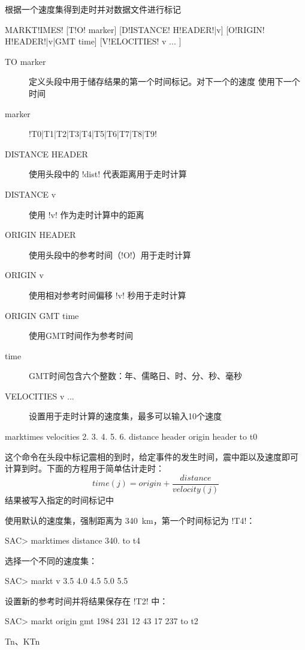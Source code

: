 \label{cmd:marktimes}

根据一个速度集得到走时并对数据文件进行标记

\begin{SACSTX}
MARKT!IMES! [T!O! marker] [D!ISTANCE! H!EADER!|v] [O!RIGIN! H!EADER!|v|GMT time]
    [V!ELOCITIES! v ... ]
\end{SACSTX}

\begin{description}
\item [TO marker] 定义头段中用于储存结果的第一个时间标记。对下一个的速度
    使用下一个时间
\item [marker] !T0|T1|T2|T3|T4|T5|T6|T7|T8|T9!
\item [DISTANCE HEADER] 使用头段中的 !dist! 代表距离用于走时计算
\item [DISTANCE v] 使用 !v! 作为走时计算中的距离
\item [ORIGIN HEADER] 使用头段中的参考时间（!O!）用于走时计算
\item [ORIGIN v] 使用相对参考时间偏移 !v! 秒用于走时计算
\item [ORIGIN GMT time] 使用GMT时间作为参考时间
\item [time] GMT时间包含六个整数：年、儒略日、时、分、秒、毫秒
\item [VELOCITIES v ...] 设置用于走时计算的速度集，最多可以输入10个速度
\end{description}

\begin{SACDFT}
marktimes velocities 2. 3. 4. 5. 6. distance header origin header to t0
\end{SACDFT}

这个命令在头段中标记震相的到时，给定事件的发生时间，震中距以及速度即可
计算到时。下面的方程用于简单估计走时：
 		\[ time(j) = origin + \frac{distance}{velocity(j)} \]
结果被写入指定的时间标记中

使用默认的速度集，强制距离为 \SI{340}{\km}，第一个时间标记为 !T4!：
\begin{SACCode}
SAC> marktimes distance 340. to t4
\end{SACCode}

选择一个不同的速度集：
\begin{SACCode}
SAC> markt v 3.5 4.0 4.5 5.0 5.5
\end{SACCode}

设置新的参考时间并将结果保存在 !T2! 中：
\begin{SACCode}
SAC> markt origin gmt 1984 231 12 43 17 237 to t2
\end{SACCode}

Tn、KTn
